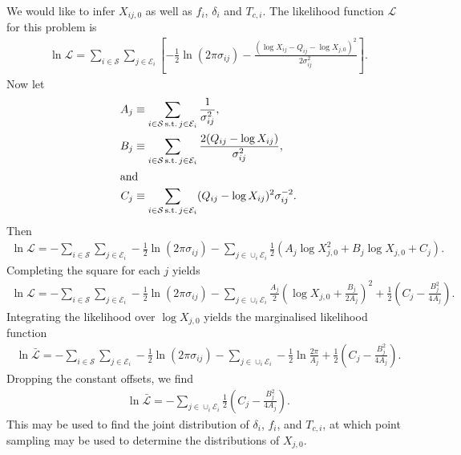 \documentclass[preprint]{revtex4-1}
\begin{document}
We would like to infer $X_{ij,0}$ as well as $f_i$, $\delta_i$ and $T_{c,i}$.
The likelihood function $\mathcal{L}$ for this problem is
\begin{align}
	\ln \mathcal{L} = \sum_{i \in \mathcal{S}} \sum_{j\in \mathcal{E}_i} \left[-\frac{1}{2}\ln(2\pi\sigma_{ij}) - \frac{(\log X_{ij} - Q_{ij} - \log X_{j,0})^2}{2\sigma_{ij}^2}\right].
\end{align}
Now let
\begin{align}
	A_{j} &\equiv \sum_{i\in \mathcal{S}\mathrm{\,s.t.\,}j\in\mathcal{E}_i}\frac{1}{\sigma_{ij}^2},\\
	B_{j} &\equiv \sum_{i\in \mathcal{S}\mathrm{\,s.t.\,}j\in\mathcal{E}_i} \frac{2 (Q_{ij} - \log X_{ij})}{\sigma_{ij}^2},\\
	\intertext{and}
	C_{j} &\equiv \sum_{i\in \mathcal{S}\mathrm{\,s.t.\,}j\in\mathcal{E}_i} (Q_{ij} - \log X_{ij})^2\sigma_{ij}^{-2}.
\end{align}
Then
\begin{align}
	\ln \mathcal{L} = -\sum_{i \in \mathcal{S}} \sum_{j\in \mathcal{E}_i} -\frac{1}{2}\ln(2\pi\sigma_{ij}) - \sum_{j\in \cup_i \mathcal{E}_i} \frac{1}{2}\left(A_j \log X_{j,0}^2 + B_j \log X_{j,0} + C_j\right).
\end{align}
Completing the square for each $j$ yields
\begin{align}
	\ln \mathcal{L} = -\sum_{i \in \mathcal{S}} \sum_{j\in \mathcal{E}_i} -\frac{1}{2}\ln(2\pi\sigma_{ij}) - \sum_{j\in \cup_i \mathcal{E}_i} \frac{A_j}{2}\left(\log X_{j,0} + \frac{B_j}{2A_j}\right)^2 + \frac{1}{2}\left(C_j - \frac{B_j^2}{4A_j}\right).
\end{align}
Integrating the likelihood over $\log X_{j,0}$ yields the marginalised likelihood function
\begin{align}
	\ln \bar{\mathcal{L}} = -\sum_{i \in \mathcal{S}} \sum_{j\in \mathcal{E}_i} -\frac{1}{2}\ln(2\pi\sigma_{ij}) - \sum_{j\in \cup_i \mathcal{E}_i} -\frac{1}{2}\ln\frac{2\pi}{A_j} + \frac{1}{2}\left(C_j - \frac{B_j^2}{4A_j}\right).
\end{align}
Dropping the constant offsets, we find
\begin{align}
	\ln \bar{\mathcal{L}} = -\sum_{j\in \cup_i \mathcal{E}_i} \frac{1}{2}\left(C_j - \frac{B_j^2}{4A_j}\right).
\end{align}
This may be used to find the joint distribution of $\delta_i$, $f_i$, and $T_{c,i}$, at which point sampling may be used to determine the distributions of $X_{j,0}$.
\end{document}

